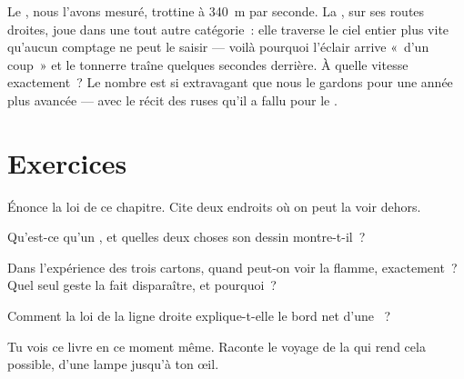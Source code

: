 \begin{remark}\label{rem:g4:light-straight-lines:speed}
Le , nous l'avons mesuré, trottine à \qty{340}{m} par seconde. La
, sur ses routes droites, joue dans une tout autre catégorie~:
elle traverse le ciel entier plus vite qu'aucun comptage ne peut le
saisir --- voilà pourquoi l'éclair arrive «~d'un coup~» et le
tonnerre traîne quelques secondes derrière. À quelle vitesse
exactement~? Le nombre est si extravagant que nous le gardons pour
une année plus avancée --- avec le récit des ruses qu'il a fallu pour
le .
\end{remark}

\section{Exercices}

\begin{exercise}[$\star$]\label{exo:g4:light-straight-lines:1}
Énonce la loi de ce chapitre. Cite deux endroits où on peut la voir
dehors.
\end{exercise}

\begin{exercise}[$\star$]\label{exo:g4:light-straight-lines:2}
Qu'est-ce qu'un , et quelles deux choses son dessin
montre-t-il~?
\end{exercise}

\begin{exercise}[$\star$]\label{exo:g4:light-straight-lines:3}
Dans l'expérience des trois cartons, quand peut-on voir la flamme,
exactement~? Quel seul geste la fait disparaître, et pourquoi~?
\end{exercise}

\begin{exercise}[$\star$]\label{exo:g4:light-straight-lines:4}
Comment la loi de la ligne droite explique-t-elle le bord net d'une
~?
\end{exercise}

\begin{exercise}[$\star$]\label{exo:g4:light-straight-lines:5}
Tu vois ce livre en ce moment même. Raconte le voyage de la 
qui rend cela possible, d'une lampe jusqu'à ton œil.
\end{exercise}

